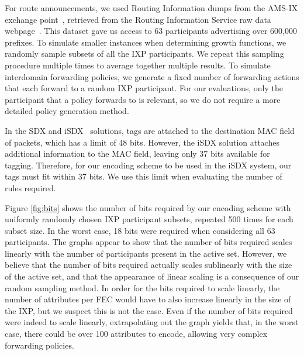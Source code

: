 For route announcements, we used Routing Information dumps from the AMS-IX exchange point~\cite{ams-ix}, retrieved from the Routing Information Service raw data webpage~\cite{ris}. This dataset gave us access to 63 participants advertising over 600,000 prefixes. 
To simulate smaller instances when determining growth functions, we randomly sample subsets of all the IXP participants. We repeat this sampling procedure multiple times to average together multiple results.
To simulate interdomain forwarding policies, we generate a fixed number of forwarding actions that each forward to a random IXP participant. For our evaluations, only the participant that a policy forwards to is relevant, so we do not require a more detailed policy generation method. 

In the SDX and iSDX~\cite{sdx, isdx} solutions, tags are attached to the destination MAC field of packets, which has a limit of 48 bits. However, the iSDX solution attaches additional information to the MAC field, leaving only 37 bits available for tagging. Therefore, for our encoding scheme to be used in the iSDX system, our tags must fit within 37 bits. We use this limit when evaluating the number of rules required. 

Figure \ref{fig:bits} shows the number of bits required by our encoding scheme with uniformly randomly chosen IXP participant subsets, repeated 500 times for each subset size. In the worst case, 18 bits were required when considering all 63 participants. The graphs appear to show that the number of bits required scales linearly with the number of participants present in the active set. However, we believe that the number of bits required actually scales sublinearly with the size of the active set, and that the appearance of linear scaling is a consequence of our random sampling method. In order for the bits required to scale linearly, the number of attributes per FEC would have to also increase linearly in the size of the IXP, but we suspect this is not the case. Even if the number of bits required were indeed to scale linearly, extrapolating out the graph yields that, in the worst case, there could be over 100 attributes to encode, allowing very complex forwarding policies.

